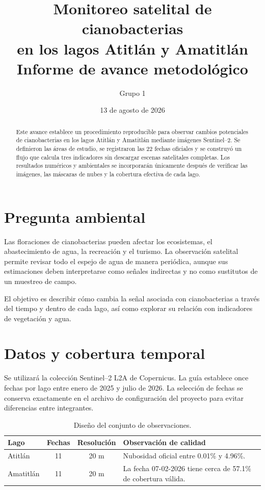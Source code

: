 \documentclass[11pt,letterpaper]{article}
\title{\vspace{-1.5cm}\color{azulprofundo}\textbf{Monitoreo satelital de cianobacterias\\en los lagos Atitlán y Amatitlán}\\[0.45em]
\large Informe de avance metodológico}
\author{Grupo 1}
\date{13 de agosto de 2026}
\begin{document}
\maketitle

\begin{abstract}
Este avance establece un procedimiento reproducible para observar cambios potenciales de cianobacterias en los lagos Atitlán y Amatitlán mediante imágenes Sentinel--2. Se definieron las áreas de estudio, se registraron las 22 fechas oficiales y se construyó un flujo que calcula tres indicadores sin descargar escenas satelitales completas. Los resultados numéricos y ambientales se incorporarán únicamente después de verificar las imágenes, las máscaras de nubes y la cobertura efectiva de cada lago.
\end{abstract}

\section{Pregunta ambiental}

Las floraciones de cianobacterias pueden afectar los ecosistemas, el abastecimiento de agua, la recreación y el turismo. La observación satelital permite revisar todo el espejo de agua de manera periódica, aunque sus estimaciones deben interpretarse como señales indirectas y no como sustitutos de un muestreo de campo.

El objetivo es describir cómo cambia la señal asociada con cianobacterias a través del tiempo y dentro de cada lago, así como explorar su relación con indicadores de vegetación y agua.

\section{Datos y cobertura temporal}

Se utilizará la colección Sentinel--2 L2A de Copernicus. La guía establece once fechas por lago entre enero de 2025 y julio de 2026. La selección de fechas se conserva exactamente en el archivo de configuración del proyecto para evitar diferencias entre integrantes.

\begin{table}[h]
\centering
\caption{Diseño del conjunto de observaciones.}
\begin{tabularx}{\textwidth}{lccX}
\toprule
\textbf{Lago} & \textbf{Fechas} & \textbf{Resolución} & \textbf{Observación de calidad} \\
\midrule
Atitlán & 11 & 20 m & Nubosidad oficial entre 0.01\% y 4.96\%. \\
Amatitlán & 11 & 20 m & La fecha 07-02-2026 tiene cerca de 57.1\% de cobertura válida. \\
\bottomrule
\end{tabularx}
\end{table}
\end{document}
